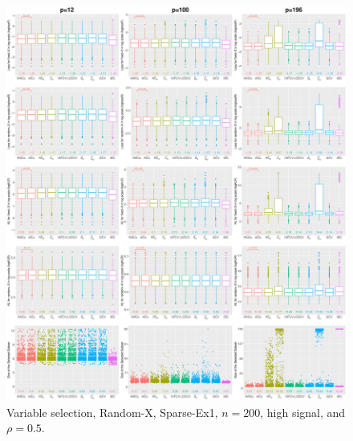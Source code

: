\begin{figure}[!ht]
\centering
\includegraphics[width=\textwidth]{figures/supplement/randomx/subset_selection/Sparse-Ex1_n200_hsnr_rho05.eps}
\caption{Variable selection, Random-X, Sparse-Ex1, $n=200$, high signal, and $\rho=0.5$.}
\end{figure}
\clearpage
